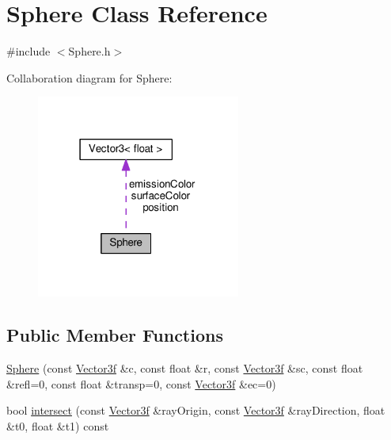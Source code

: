 \hypertarget{class_sphere}{}\section{Sphere Class Reference}
\label{class_sphere}


{\ttfamily \#include $<$Sphere.\+h$>$}



Collaboration diagram for Sphere\+:
\nopagebreak
\begin{figure}[H]
\begin{center}
\leavevmode
\includegraphics[width=190pt]{class_sphere__coll__graph}
\end{center}
\end{figure}
\subsection*{Public Member Functions}
\begin{DoxyCompactItemize}
\item 
\hyperlink{class_sphere_a46b4e530fe3204b5dfc0547cec96dbaa}{Sphere} (const \hyperlink{_vector3_8h_af345ad77ba5e240c7ab72b4b2077e754}{Vector3f} \&c, const float \&r, const \hyperlink{_vector3_8h_af345ad77ba5e240c7ab72b4b2077e754}{Vector3f} \&sc, const float \&refl=0, const float \&transp=0, const \hyperlink{_vector3_8h_af345ad77ba5e240c7ab72b4b2077e754}{Vector3f} \&ec=0)
\item 
bool \hyperlink{class_sphere_a35ba0414bedd68d86349273db13cca7d}{intersect} (const \hyperlink{_vector3_8h_af345ad77ba5e240c7ab72b4b2077e754}{Vector3f} \&ray\+Origin, const \hyperlink{_vector3_8h_af345ad77ba5e240c7ab72b4b2077e754}{Vector3f} \&ray\+Direction, float \&t0, float \&t1) const
\end{DoxyCompactItemize}
